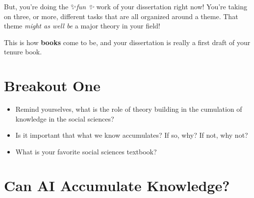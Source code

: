 \documentclass[
  letterpaper,
  DIV=11,
  numbers=noendperiod]{scrreprt}
\begin{document}
But, you're doing the ✨\emph{fun ✨} work of your dissertation right
now! You're taking on three, or more, different tasks that are all
organized around a theme. That theme \emph{might as well be} a major
theory in your field!

This is how \textbf{books} come to be, and your dissertation is really a
first draft of your tenure book.

\section{Breakout One}\label{breakout-one}

\begin{tcolorbox}[enhanced jigsaw, bottomtitle=1mm, coltitle=black, colback=white, colframe=quarto-callout-note-color-frame, title=\textcolor{quarto-callout-note-color}{\faInfo}\hspace{0.5em}{Breakout 1}, opacityback=0, arc=.35mm, titlerule=0mm, leftrule=.75mm, toptitle=1mm, rightrule=.15mm, opacitybacktitle=0.6, colbacktitle=quarto-callout-note-color!10!white, toprule=.15mm, left=2mm, bottomrule=.15mm, breakable]

\begin{itemize}
\item
  Remind yourselves, what is the role of theory building in the
  cumulation of knowledge in the social sciences?
\item
  Is it important that what we know accumulates? If so, why? If not, why
  not?
\item
  What is your favorite social sciences textbook?
\end{itemize}

\end{tcolorbox}

\section{Can AI Accumulate
Knowledge?}\label{can-ai-accumulate-knowledge}
\end{document}
